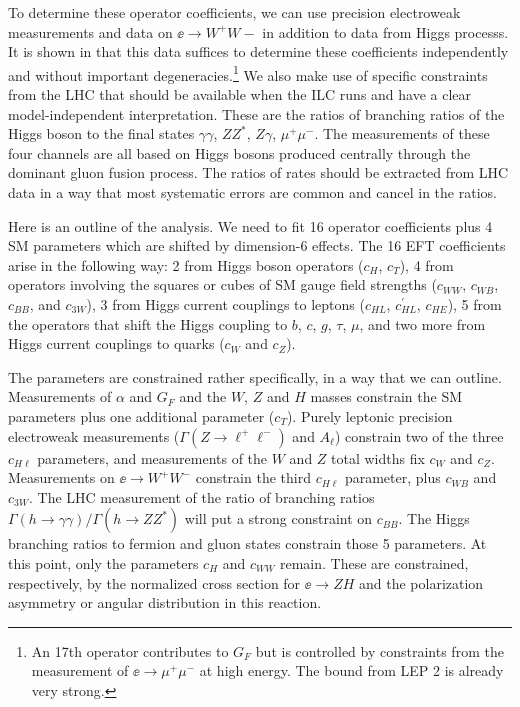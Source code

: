 To determine
 these operator coefficients, we can use precision electroweak measurements and
 data on $\ee\to W^+W-$ in addition to data 
from Higgs processs.
   It is shown in 
\cite{Barklow:2017suo,Barklow:2017awn} that this data suffices to determine these
coefficients independently and without important 
degeneracies.\footnote{An 17th operator contributes to $G_F$
  but is controlled by constraints from the measurement of  $\ee\to
  \mu^+\mu^-$ at high energy.  The bound from LEP 2 is already very
  strong.}     We also make use of specific constraints from the LHC
that should be available when the ILC runs and have a clear
model-independent interpretation.  These are the ratios of branching ratios of the Higgs boson to the final states $\gamma\gamma$, $ZZ^*$, $Z\gamma$, $\mu^+\mu^-$.  The measurements of these four channels are all based on Higgs bosons produced centrally through the dominant gluon fusion process.  The ratios of rates should be extracted
 from LHC data in
a way that most systematic errors are common and cancel in the ratios. 

Here is an outline of the analysis. We need to fit 16 operator
coefficients plus 4 SM parameters which are shifted by dimension-6
effects.  The 16
EFT coefficients arise in the following way:  2 from Higgs boson
operators ($c_H$, $c_T$), 4 from operators involving the
squares or cubes of SM gauge field strengths ($c_{WW}$, $c_{WB}$,
$c_{BB}$, and $c_{3W}$), 3 from Higgs current couplings to leptons
($c_{HL}$, $c_{HL}^\prime$, $c_{HE}$), 5 from the operators that shift
the Higgs coupling to $b$, $c$, $g$, $\tau$, $\mu$, and two more from
Higgs current couplings to quarks ($c_{W}$ and $c_Z$).  

The parameters are
constrained rather specifically, in a way that we can outline.  Measurements of
$\alpha$ and 
$G_F$ and the $W$, $Z$ and $H$ masses constrain the SM parameters plus
one additional parameter ($c_T$).  Purely leptonic precision electroweak 
measurements ($\Gamma(Z\to \ell^+\ell^-)$ and $A_{\ell}$) constrain
two of the three $c_{H\ell}$ parameters, and measurements of the $W$
and $Z$ total widths fix $c_W$ and $c_Z$.   Measurements on $\ee\to
W^+W^-$ constrain  the third $c_{H\ell}$  parameter, plus $c_{WB}$ and
$c_{3W}$.    The LHC measurement of the ratio of branching ratios 
$\Gamma(h\to \gamma\gamma)/\Gamma(h\to ZZ^*)$ will put a strong
constraint on $c_{BB}$.   The Higgs branching ratios to fermion and
gluon states constrain those 5 parameters.  At this point, only the
parameters $c_H$ and $c_{WW}$ remain.  These are constrained, respectively, by the
normalized cross section for $\ee\to ZH$ and the polarization
asymmetry or angular distribution in this reaction.  

